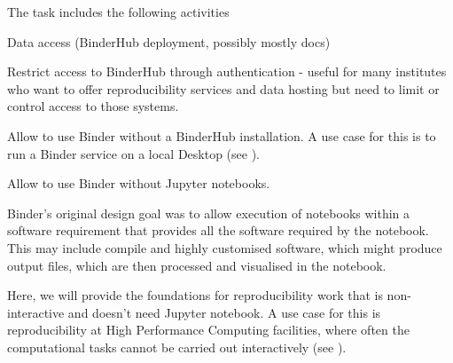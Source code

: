 \begin{task}[
  title=Support more use patterns,
  id=patterns,
  lead=SRL,
  PM=1,
  wphases={0-36},
  partners={MP}
]
The task includes the following activities
  \begin{compactitem}
  \item Data access (BinderHub deployment, possibly mostly docs)
  \item Restrict access to BinderHub through authentication
    - useful for many institutes who want to offer reproducibility services and
    data hosting but need to limit or control access to those systems. 
  \item Allow to use Binder without a BinderHub installation. A use case for
    this is to run a Binder service on a local Desktop (see
    ).
  \item Allow to use Binder without Jupyter notebooks.

    Binder's original design goal was to allow execution of notebooks within a
    software requirement that provides all the software required by the
    notebook. This may include compile and highly customised software, which
    might produce output files, which are then processed and visualised in the
    notebook.

    Here, we will provide the foundations for reproducibility work that is
    non-interactive and doesn't need Jupyter notebook. A use case for this is
    reproducibility at High Performance Computing facilities, where often the
    computational tasks cannot be carried out interactively (see ).


  \end{compactitem}
\end{task}
